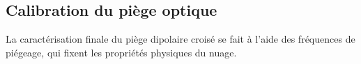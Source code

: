 \subsection{Calibration du piège optique}
\label{sc:calibration_piege_optique}

La caractérisation finale du piège dipolaire croisé se fait à l'aide des fréquences de piégeage, qui fixent les propriétés physiques du nuage. %


